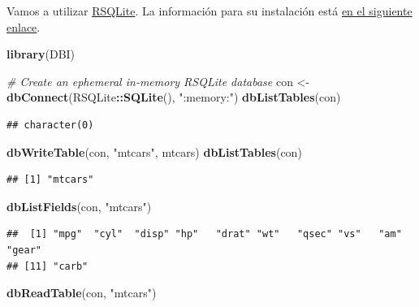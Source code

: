 \documentclass[]{book}
\newenvironment{Shaded}{\begin{snugshade}}{\end{snugshade}}
\newcommand{\KeywordTok}[1]{\textcolor[rgb]{0.13,0.29,0.53}{\textbf{#1}}}
\newcommand{\StringTok}[1]{\textcolor[rgb]{0.31,0.60,0.02}{#1}}
\newcommand{\CommentTok}[1]{\textcolor[rgb]{0.56,0.35,0.01}{\textit{#1}}}
\newcommand{\OperatorTok}[1]{\textcolor[rgb]{0.81,0.36,0.00}{\textbf{#1}}}
\newcommand{\NormalTok}[1]{#1}
\begin{document}
Vamos a utilizar
\href{https://cran.r-project.org/web/packages/RSQLite/index.html}{RSQLite}.
La información para su instalación está
\href{https://db.rstudio.com/databases/sqlite/}{en el siguiente enlace}.

\begin{Shaded}
\begin{Highlighting}[]
\KeywordTok{library}\NormalTok{(DBI)}

\CommentTok{# Create an ephemeral in-memory RSQLite database}
\NormalTok{con <-}\StringTok{ }\KeywordTok{dbConnect}\NormalTok{(RSQLite}\OperatorTok{::}\KeywordTok{SQLite}\NormalTok{(), }\StringTok{":memory:"}\NormalTok{)}
\KeywordTok{dbListTables}\NormalTok{(con)}
\end{Highlighting}
\end{Shaded}

\begin{verbatim}
## character(0)
\end{verbatim}

\begin{Shaded}
\begin{Highlighting}[]
\KeywordTok{dbWriteTable}\NormalTok{(con, }\StringTok{"mtcars"}\NormalTok{, mtcars)}
\KeywordTok{dbListTables}\NormalTok{(con)}
\end{Highlighting}
\end{Shaded}

\begin{verbatim}
## [1] "mtcars"
\end{verbatim}

\begin{Shaded}
\begin{Highlighting}[]
\KeywordTok{dbListFields}\NormalTok{(con, }\StringTok{"mtcars"}\NormalTok{)}
\end{Highlighting}
\end{Shaded}

\begin{verbatim}
##  [1] "mpg"  "cyl"  "disp" "hp"   "drat" "wt"   "qsec" "vs"   "am"   "gear"
## [11] "carb"
\end{verbatim}

\begin{Shaded}
\begin{Highlighting}[]
\KeywordTok{dbReadTable}\NormalTok{(con, }\StringTok{"mtcars"}\NormalTok{)}
\end{Highlighting}
\end{Shaded}
\end{document}
